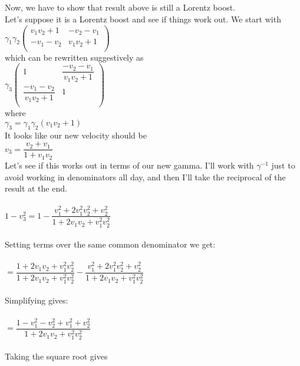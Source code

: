 \documentclass[prb,preprint]
{revtex4-1}
\newcommand{\PRLsep}{\noindent\makebox[\linewidth]{\resizebox{0.8888\linewidth}{2pt}{$\bullet$}}\bigskip}
\begin{document}
\\
\\
\PRLsep
\\
\\
Now, we have to show that result above is still a Lorentz boost.
\\
Let's suppose it is a Lorentz boost and see if things work out.  We start with
\\
$\gamma_1 \gamma_2 
\begin{pmatrix}
v_1 v_2 + 1 & -v_2 - v_1\\
-v_1 - v_2 & v_1 v_2 + 1\\
\end{pmatrix} $
\\
which can be rewritten suggestively as
\\
$\gamma_3 
\begin{pmatrix}
1 & \dfrac{-v_2 - v_1}{v_1 v_2 + 1}\\
\dfrac{-v_1 - v_2}{v_1 v_2 + 1} & 1\\
\end{pmatrix} $
\\
where 
\\
$\gamma_3 = \gamma_1 \gamma_2 \left(v_1 v_2 + 1\right)$
\\
It looks like our new velocity should be 
\\
$v_3 = \dfrac{v_2 + v_1}{1 + v_1 v_2}$
\\
Let's see if this works out in terms of our new gamma.  I'll work with $\gamma^{-1}$ just to avoid working in denominators all day, and then I'll take the reciprocal of the result at the end.
\\
\\
$1 - v_3^2 = 1 - \dfrac{v_1^2 + 2v_1^2 v_2^2 + v_2^2}{1 + 2 v_1 v_2 + v_1^2 v_2^2}$
\\
\\
Setting terms over the same common denominator we get:
\\
\\
$= \dfrac{1 + 2 v_1 v_2 + v_1^2 v_2^2}{1 + 2 v_1 v_2 + v_1^2 v_2^2} - \dfrac{v_1^2 + 2v_1^2 v_2^2 + v_2^2}{1 + 2 v_1 v_2 + v_1^2 v_2^2}$
\\
\\
Simplifying gives:
\\
\\
$= \dfrac{1 - v_1^2 - v_2^2 + v_1^2 + v_2^2}{1 + 2 v_1 v_2 + v_1^2 v_2^2}$
\\
\\
Taking the square root gives
\\
\\
\end{document}
